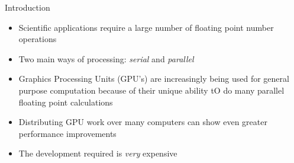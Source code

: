 \begin{block}{\Large Introduction}
\begin{itemize}
\item{Scientific applications require a large number of floating point number
operations}
\item{Two main ways of processing: \emph{serial} and \emph{parallel}}
\item{Graphics Processing Units (GPU's) are increasingly being used for general
purpose computation because of their unique ability tO do many parallel
floating point calculations}
\item{Distributing GPU work over many computers can show even greater
performance improvements}
\item{The development required is \emph{very} expensive}
\end{itemize}
\end{block}
